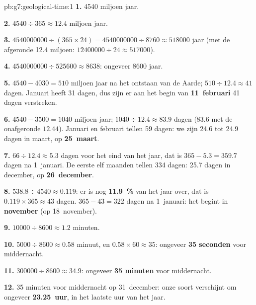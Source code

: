 \begin{solution}{pb:g7:geological-time:1}
\textbf{1.} \num{4540} miljoen jaar.

\textbf{2.} $4540 \div 365 \approx 12.4$ miljoen jaar.

\textbf{3.} $\num{4540000000} \div (365 \times 24) = \num{4540000000}
\div 8760 \approx \num{518000}$ jaar (met de afgeronde \num{12.4}
miljoen: $\num{12400000} \div 24 \approx \num{517000}$).

\textbf{4.} $\num{4540000000} \div \num{525600} \approx 8638$: ongeveer
\num{8600} jaar.

\textbf{5.} $4540 - 4030 = 510$ miljoen jaar na het ontstaan van de Aarde;
$510 \div 12.4 \approx 41$ dagen. Januari heeft 31 dagen, dus zijn er aan
het begin van \textbf{11~februari} 41 dagen verstreken.

\textbf{6.} $4540 - 3500 = 1040$ miljoen jaar; $1040 \div 12.4 \approx
83.9$ dagen (83.6 met de onafgeronde $12.44$). Januari en
februari tellen 59 dagen: we zijn 24.6 tot 24.9 dagen in maart,
op \textbf{25~maart}.

\textbf{7.} $66 \div 12.4 \approx 5.3$ dagen voor het eind van het jaar,
dat is $365 - 5.3 = 359.7$ dagen na 1~januari. De eerste elf maanden
tellen 334 dagen: 25.7 dagen in december, op \textbf{26~december}.

\textbf{8.} $538.8 \div 4540 \approx 0.119$: er is nog \textbf{11.9~\%}
van het jaar over, dat is $0.119 \times 365 \approx 43$ dagen. $365 - 43 =
322$ dagen na 1~januari: het begint in \textbf{november} (op
18~november).

\textbf{9.} $\num{10000} \div 8600 \approx 1.2$ minuten.

\textbf{10.} $5000 \div 8600 \approx 0.58$ minuut, en $0.58 \times 60
\approx 35$: ongeveer \textbf{35 seconden} voor middernacht.

\textbf{11.} $\num{300000} \div 8600 \approx 34.9$: ongeveer \textbf{35
minuten} voor middernacht.

\textbf{12.} 35 minuten voor middernacht op 31~december: onze soort
verschijnt om ongeveer \textbf{23.25~uur}, in het laatste uur van het jaar.
\end{solution}
